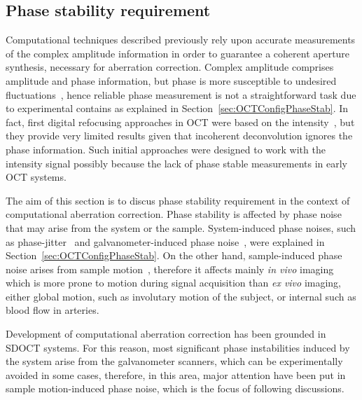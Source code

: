 \subsection{Phase stability requirement} \label{sec:phaseStab}

Computational techniques described previously rely upon accurate measurements of the complex amplitude information in order to guarantee a coherent aperture synthesis, necessary for aberration correction. Complex amplitude comprises amplitude and phase information, but phase is more susceptible to undesired fluctuations~\cite{Vakoc2005_Phaseresolved}, hence reliable phase measurement is not a straightforward task due to experimental contains as explained in Section~\ref{sec:OCTConfigPhaseStab}. In fact, first digital refocusing approaches in OCT were based on the intensity~\cite{Ralston2005_Deconvolution, Woolliams2010_Spatially, Y.Liu2009_Deconvolution}, but they provide very limited results given that incoherent deconvolution ignores the phase information. Such initial approaches were designed to work with the intensity signal possibly because the lack of phase stable measurements in early OCT systems.

The aim of this section is to discus phase stability requirement in the context of computational aberration correction. Phase stability is affected by phase noise that may arise from the system or the sample. System-induced phase noises, such as phase-jitter~\cite{Vakoc2005_Phaseresolved} and galvanometer-induced phase noise~\cite{Adie2015_Interferometric, White2003_vivo}, were explained in Section~\ref{sec:OCTConfigPhaseStab}. On the other hand, sample-induced phase noise arises from sample motion~\cite{Shemonski2014_Stability-1}, therefore it affects mainly \textit{in vivo} imaging which is more prone to motion during signal acquisition than \textit{ex vivo} imaging, either global motion, such as involutary motion of the subject, or internal such as blood flow in arteries.

Development of computational aberration correction has been grounded in SDOCT systems. For this reason, most significant phase instabilities induced by the system arise from the galvanometer scanners, which can be experimentally avoided in some cases, therefore, in this area, major attention have been put in sample motion-induced phase noise, which is the focus of following discussions.

